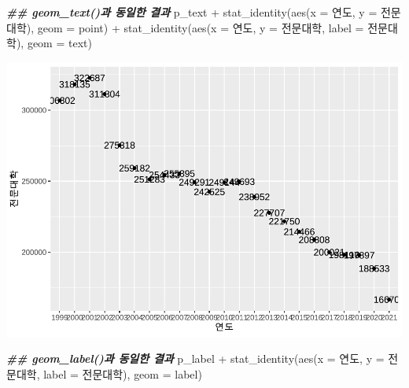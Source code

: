 \documentclass[
]{article}
\newenvironment{Shaded}{\begin{snugshade}}{\end{snugshade}}
\newcommand{\AttributeTok}[1]{\textcolor[rgb]{0.77,0.63,0.00}{#1}}
\newcommand{\DocumentationTok}[1]{\textcolor[rgb]{0.56,0.35,0.01}{\textbf{\textit{#1}}}}
\newcommand{\FunctionTok}[1]{\textcolor[rgb]{0.00,0.00,0.00}{#1}}
\newcommand{\NormalTok}[1]{#1}
\newcommand{\SpecialCharTok}[1]{\textcolor[rgb]{0.00,0.00,0.00}{#1}}
\newcommand{\StringTok}[1]{\textcolor[rgb]{0.31,0.60,0.02}{#1}}
\begin{document}
\begin{Shaded}
\begin{Highlighting}[]
\DocumentationTok{\#\# geom\_text()과 동일한 결과}
\NormalTok{p\_text }\SpecialCharTok{+}
  \FunctionTok{stat\_identity}\NormalTok{(}\FunctionTok{aes}\NormalTok{(}\AttributeTok{x =}\NormalTok{ 연도, }\AttributeTok{y =}\NormalTok{ 전문대학), }\AttributeTok{geom =} \StringTok{\textquotesingle{}point\textquotesingle{}}\NormalTok{) }\SpecialCharTok{+}
  \FunctionTok{stat\_identity}\NormalTok{(}\FunctionTok{aes}\NormalTok{(}\AttributeTok{x =}\NormalTok{ 연도, }\AttributeTok{y =}\NormalTok{ 전문대학, }\AttributeTok{label =}\NormalTok{ 전문대학), }\AttributeTok{geom =} \StringTok{\textquotesingle{}text\textquotesingle{}}\NormalTok{)}
\end{Highlighting}
\end{Shaded}

\includegraphics{chap3_files/figure-latex/unnamed-chunk-51-5.pdf}

\begin{Shaded}
\begin{Highlighting}[]
\DocumentationTok{\#\# geom\_label()과 동일한 결과}
\NormalTok{p\_label }\SpecialCharTok{+}
  \FunctionTok{stat\_identity}\NormalTok{(}\FunctionTok{aes}\NormalTok{(}\AttributeTok{x =}\NormalTok{ 연도, }\AttributeTok{y =}\NormalTok{ 전문대학, }\AttributeTok{label =}\NormalTok{ 전문대학), }\AttributeTok{geom =} \StringTok{\textquotesingle{}label\textquotesingle{}}\NormalTok{)}
\end{Highlighting}
\end{Shaded}
\end{document}
